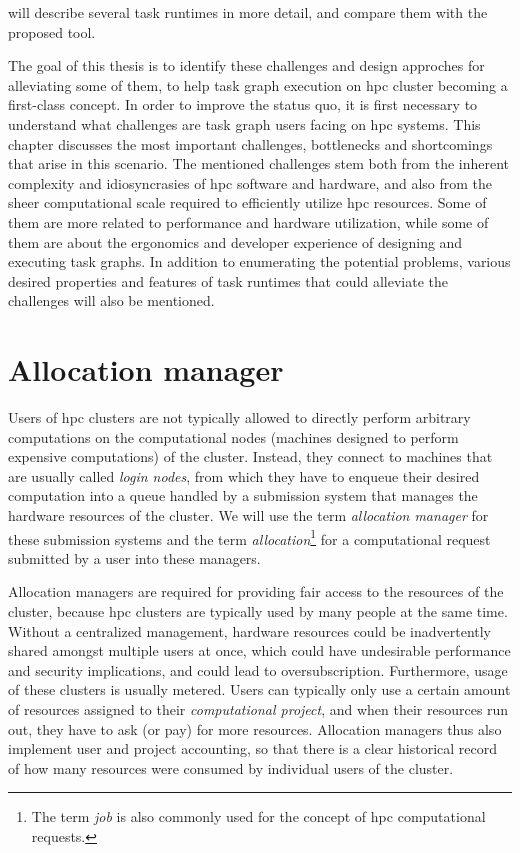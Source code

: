  will describe several task runtimes in more detail, and compare them with the proposed
\hyperqueue{} tool.

The goal of this thesis is to identify these challenges and design approches for alleviating some
of them, to help task graph execution on \gls{hpc} cluster becoming a first-class
concept. In order to improve the status quo, it is first necessary to understand what challenges
are task graph users facing on \gls{hpc} systems. This chapter discusses the most
important challenges, bottlenecks and shortcomings that arise in this scenario. The mentioned
challenges stem both from the inherent complexity and idiosyncrasies of \gls{hpc}
software and hardware, and also from the sheer computational scale required to efficiently utilize
\gls{hpc} resources. Some of them are more related to performance and hardware
utilization, while some of them are about the ergonomics and developer experience of designing and
executing task graphs. In addition to enumerating the potential problems, various desired
properties and features of task runtimes that could alleviate the challenges will also be
mentioned.


\section{Allocation manager}
\label{challenge:allocation-manager}
Users of \gls{hpc} clusters are not typically allowed to directly perform
arbitrary computations on the computational nodes (machines designed to perform expensive
computations) of the cluster. Instead, they connect to machines that are usually called
\emph{login nodes}, from which they have to enqueue their desired computation into a queue
handled by a submission system that manages the hardware resources of the cluster. We will use the
term \emph{allocation manager} for these submission systems and the term
\emph{allocation}\footnote{The term \emph{job} is also commonly used for the concept of
\gls{hpc} computational requests.} for a computational request submitted by a
user into these managers.

Allocation managers are required for providing fair access to the resources of the cluster, because
\gls{hpc} clusters are typically used by many people at the same time. Without a
centralized management, hardware resources could be inadvertently shared amongst multiple users at
once, which could have undesirable performance and security implications, and could lead to
oversubscription. Furthermore, usage of these clusters is usually metered. Users can typically only
use a certain amount of resources assigned to their \emph{computational project}, and when their
resources run out, they have to ask (or pay) for more resources. Allocation managers thus also
implement user and project accounting, so that there is a clear historical record of how many
resources were consumed by individual users of the cluster.

